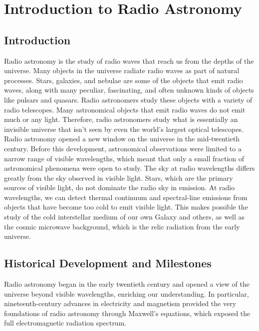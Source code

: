 \chapter{Introduction to Radio Astronomy}

\section{Introduction}
Radio astronomy is the study of radio waves that reach us from the depths of the universe. Many objects in the universe radiate radio waves as part of natural processes. Stars, galaxies, and nebulae are some of the objects that emit radio waves, along with many peculiar, fascinating, and often unknown kinds of objects like pulsars and quasars. Radio astronomers study these objects with a variety of radio telescopes. Many astronomical objects that emit radio waves do not emit much or any light. Therefore, radio astronomers study what is essentially an invisible universe that isn't seen by even the world's largest optical telescopes. \\

Radio astronomy opened a new window on the universe in the mid-twentieth century. Before this development, astronomical observations were limited to a narrow range of visible wavelengths, which meant that only a small fraction of astronomical phenomena were open to study. The sky at radio wavelengths differs greatly from the sky observed in visible light. Stars, which are the primary sources of visible light, do not dominate the radio sky in emission. At radio wavelengths, we can detect thermal continuum and spectral-line emissions from objects that have become too cold to emit visible light. This makes possible the study of the cold interstellar medium of our own Galaxy and others, as well as the cosmic microwave background, which is the relic radiation from the early universe.

\section{Historical Development and Milestones}

Radio astronomy began in the early twentieth century and opened a view of the universe beyond visible wavelengths, enriching our understanding. In particular, nineteenth-century advances in electricity and magnetism provided the very foundations of radio astronomy through Maxwell's equations, which exposed the full electromagnetic radiation spectrum.

